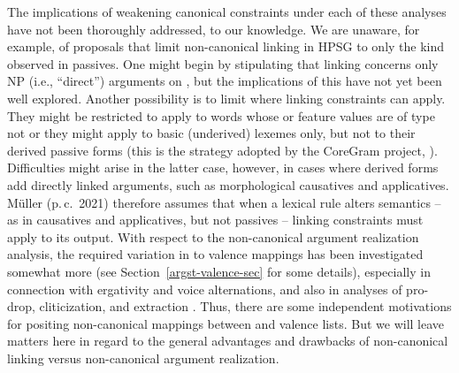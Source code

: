 \documentclass[output=paper,biblatex,babelshorthands,newtxmath,draftmode,colorlinks, citecolor=brown]{langscibook}
\begin{document}
The implications of weakening canonical constraints under each of these analyses have not been thoroughly addressed, to our knowledge.
We are unaware, for example, of proposals that limit non-canonical linking in HPSG to only the kind observed in passives.
One might begin by stipulating that linking concerns only NP (i.e., ``direct'') arguments on \argst,
but the implications of this have not yet been well explored. 
%
Another possibility is to limit where linking constraints can apply. They might be restricted to
apply to words whose  or  feature values are of type  not
 \citep[362]{runara03} or they might apply to basic (underived) lexemes only, but not to
their derived passive forms (this is the strategy adopted by the CoreGram project,
\citealt{MuellerCoreGram}). Difficulties might arise in the latter case, however, in cases where
derived forms add directly linked arguments, such as morphological causatives and applicatives.
Müller (p.\,c.\, 2021) therefore assumes that when a lexical rule alters semantics -- as in
causatives and applicatives, but not passives -- linking constraints must apply to its output.
%
With respect to the non-canonical argument realization analysis, the required variation in \argst to
valence mappings has been investigated somewhat more (see Section~\ref{argst-valence-sec} for some
details), especially in connection with ergativity and voice alternations, and also in analyses of
pro-drop, cliticization, and extraction \citep{MillerandSag1997, Manning+Sag:1999, Boumaetal2001}.
Thus, there are some independent motivations for positing non-canonical mappings between \argst and
valence lists.
But we will leave matters here in regard to the general advantages and drawbacks of non-canonical linking versus non-canonical argument realization.
\end{document}

